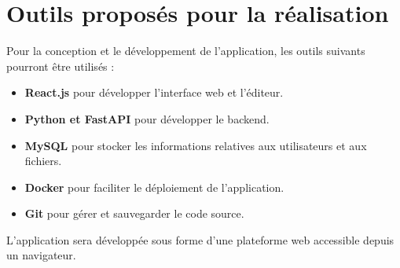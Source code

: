 \chapter{Outils proposés pour la réalisation}

Pour la conception et le développement de l'application, les outils suivants pourront être utilisés :

\begin{itemize}
    \item \textbf{React.js} pour développer l'interface web et l'éditeur.
    \item \textbf{Python et FastAPI} pour développer le backend.
    \item \textbf{MySQL} pour stocker les informations relatives aux utilisateurs et aux fichiers.
    \item \textbf{Docker} pour faciliter le déploiement de l'application.
    \item \textbf{Git} pour gérer et sauvegarder le code source.
\end{itemize}

L'application sera développée sous forme d'une plateforme web accessible depuis un navigateur.
